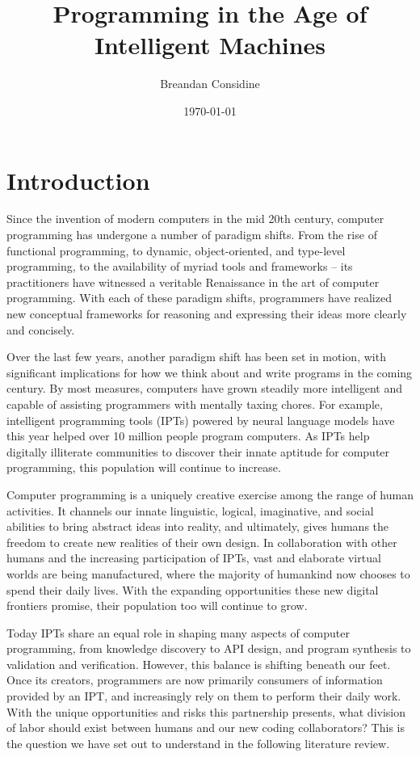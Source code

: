 \documentclass[10pt]{article}
\title{Programming in the Age of Intelligent Machines}
\author{Breandan Considine}
\date{\today}
\begin{document}
  \maketitle
  \section{Introduction}

Since the invention of modern computers in the mid 20th century, computer programming has undergone a number of paradigm shifts. From the rise of functional programming, to dynamic, object-oriented, and type-level programming, to the availability of myriad tools and frameworks -- its practitioners have witnessed a veritable Renaissance in the art of computer programming. With each of these paradigm shifts, programmers have realized new conceptual frameworks for reasoning and expressing their ideas more clearly and concisely.

Over the last few years, another paradigm shift has been set in motion, with significant implications for how we think about and write programs in the coming century. By most measures, computers have grown steadily more intelligent and capable of assisting programmers with mentally taxing chores. For example, intelligent programming tools (IPTs) powered by neural language models have this year helped over 10 million people program computers. As IPTs help digitally illiterate communities to discover their innate aptitude for computer programming, this population will continue to increase.

Computer programming is a uniquely creative exercise among the range of human activities. It channels our innate linguistic, logical, imaginative, and social abilities to bring abstract ideas into reality, and ultimately, gives humans the freedom to create new realities of their own design. In collaboration with other humans and the increasing participation of IPTs, vast and elaborate virtual worlds are being manufactured, where the majority of humankind now chooses to spend their daily lives. With the expanding opportunities these new digital frontiers promise, their population too will continue to grow.

Today IPTs share an equal role in shaping many aspects of computer programming, from knowledge discovery to API design, and program synthesis to validation and verification. However, this balance is shifting beneath our feet. Once its creators, programmers are now primarily consumers of information provided by an IPT, and increasingly rely on them to perform their daily work. With the unique opportunities and risks this partnership presents, what division of labor should exist between humans and our new coding collaborators? This is the question we have set out to understand in the following literature review.
\end{document}

